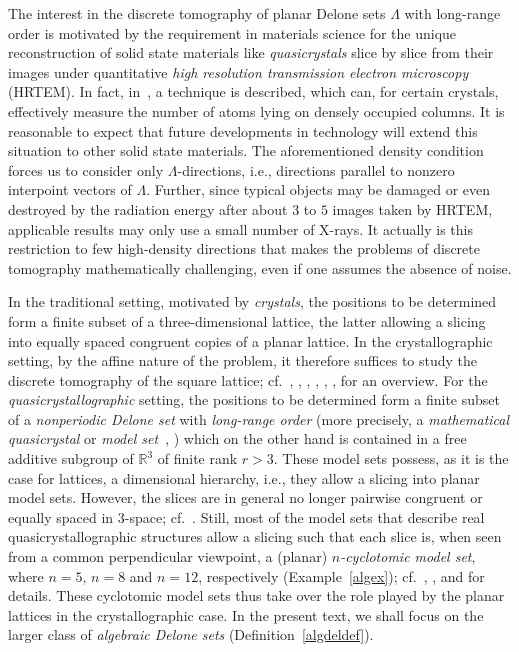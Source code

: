 \documentclass[a4paper]{amsart}
\theoremstyle{definition}
\numberwithin{equation}{section}
\numberwithin{theorem}{section}
\begin{document}
The interest in the discrete tomography of planar Delone sets $\varLambda$
with long-range order is motivated by the requirement in materials
science for the unique reconstruction of solid state materials like {\em quasicrystals}
slice by slice from their images under quantitative {\em high
  resolution transmission electron microscopy} (HRTEM). In fact,
in~\cite{ks}, \cite{sk} a technique
is described, which can, for certain 
crystals, effectively measure the number of atoms lying on densely occupied 
columns. It is reasonable to expect that future developments in
technology will extend this situation to other solid state
materials. The aforementioned density condition forces us to consider only $\varLambda$-directions, i.e.,
directions parallel to nonzero interpoint vectors of $\varLambda$. Further, since typical objects may be damaged or even destroyed by the radiation
energy after about $3$ to $5$ images taken by
HRTEM, applicable results may only use a small 
number of X-rays. It actually is this restriction to few high-density
directions that makes the
problems of discrete tomography mathematically challenging, even if
one assumes the absence of noise. 

In the
 traditional setting, motivated by {\em crystals}, the positions to be
 determined form a finite subset of a 
 three-dimensional lattice, the latter allowing a slicing into equally
 spaced 
 congruent copies of a planar lattice.  In the crystallographic
 setting, by the affine nature
 of the problem, it therefore suffices to study
 the discrete tomography of the square lattice;
 cf.~\cite{GG}, \cite{GG2}, \cite{GGP}, \cite{Gr}, \cite{HT}, \cite{HK},
 \cite{HK2} for an
 overview. For the 
 {\em quasicrystallographic} setting, the
 positions to be determined form a finite subset of a {\em nonperiodic Delone
   set} with {\em long-range order} 
 (more precisely, a {\em mathematical
   quasicrystal}  or {\em model set}~\cite{BM}, \cite{Moody}) which on the other hand is contained
 in a free additive subgroup of ${\mathbb{R}}^3$ of finite rank $r> 3$. These model sets
 possess, as it is the case for lattices, a dimensional hierarchy, i.e., they allow a slicing into
 planar model sets. However, the slices are in general no longer pairwise congruent or equally
 spaced in $3$-space; cf.~\cite{PABP2}.  Still, most of
 the model sets that describe real quasicrystallographic structures
 allow a slicing such that each slice is, when seen from a common
 perpendicular viewpoint, a (planar) {\em $n$-cyclotomic model set},
 where $n=5$, $n=8$ and $n=12$, respectively (Example~\ref{algex});
 cf.~\cite[Sec.~1.2]{H}, \cite{H2}, \cite[Sec.~4.5]{H5} and \cite{St}
 for details. These cyclotomic
 model sets thus take over the role played by the planar lattices in
 the crystallographic case. In the present text, we shall focus
 on the larger class of {\em algebraic Delone sets} (Definition~\ref{algdeldef}).
\end{document}
